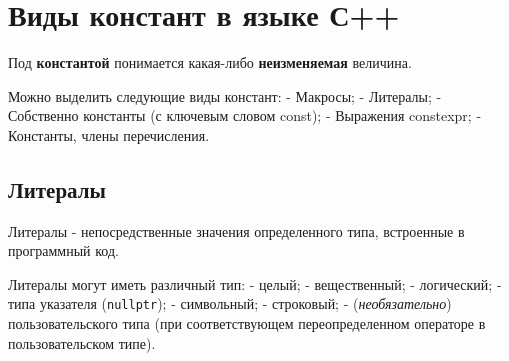 \section{Виды констант в языке
С++}\label{ux432ux438ux434ux44b-ux43aux43eux43dux441ux442ux430ux43dux442-ux432-ux44fux437ux44bux43aux435-ux441}

Под \textbf{константой} понимается какая-либо \textbf{неизменяемая}
величина.

Можно выделить следующие виды констант: - Макросы; - Литералы; -
Собственно константы (с ключевым словом const); - Выражения constexpr; -
Константы, члены перечисления.

\subsection{Литералы}\label{ux43bux438ux442ux435ux440ux430ux43bux44b}

Литералы - непосредственные значения определенного типа, встроенные в
программный код.

Литералы могут иметь различный тип: - целый; - вещественный; -
логический; - типа указателя (\texttt{nullptr}); - символьный; -
строковый; - (\emph{необязательно}) пользовательского типа (при
соответствующем переопределенном операторе в пользовательском типе).

